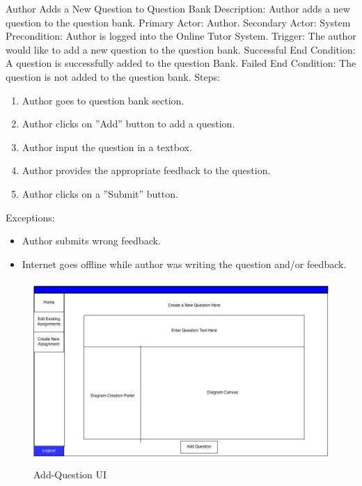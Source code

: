     \begin{section}{Author Adds a New Question to Question Bank}
      Description: Author adds a new question to the question bank. \newline
        Primary Actor: Author.  \newline
        Secondary Actor: System  \newline
        Precondition: Author is logged into the Online Tutor System. \newline
        Trigger: The author would like to add a new question to the question bank. \newline
        Successful End Condition: A question is successfully added to the question Bank. \newline
        Failed End Condition: The question is not added to the question bank.
   \newline
        \newline
        Steps:
        \begin{enumerate}
            \item{Author goes to question bank section.}
            \item{Author clicks on ''Add'' button to add a question.}
            \item{Author input the question in a textbox.}
		\item{Author provides the appropriate feedback to the question.}
		\item{Author clicks on a ''Submit'' button.}
        \end{enumerate}
        Exceptions:
        \begin{itemize}
            \item{Author submits wrong feedback.}
	    \item{Internet goes offline while author was writing the question and/or feedback.}
        \end{itemize}
        
                \begin{figure}[H]
            \centerline{\includegraphics[height=7cm]{Add.jpg}}
            \caption{Add-Question UI}
    \end{figure}
    \end{section}
    
